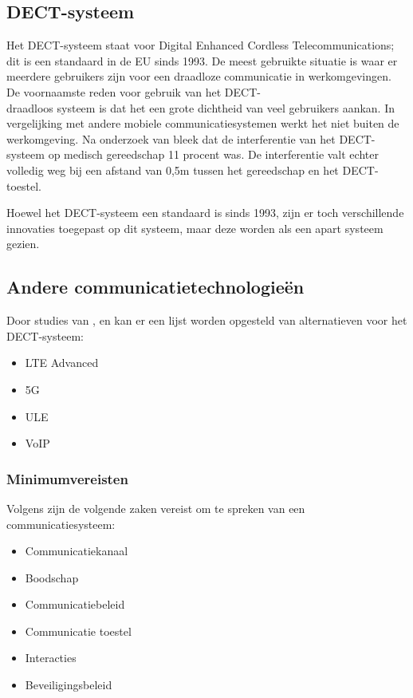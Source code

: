 \subsection{DECT-systeem}
Het DECT-systeem staat voor Digital Enhanced Cordless Telecommunications; dit is een standaard in de EU sinds 1993. De meest gebruikte situatie is waar er meerdere gebruikers zijn voor een draadloze communicatie in werkomgevingen. De voornaamste reden voor gebruik van het DECT-\\draadloos systeem is dat het een grote dichtheid van veel gebruikers aankan. In vergelijking met andere mobiele communicatiesystemen werkt het niet buiten de werkomgeving. \autocite{Welinder1997} Na onderzoek van \textcite{Welinder1997} bleek dat de interferentie van het DECT-systeem op medisch gereedschap 11 procent was. De interferentie valt echter volledig weg bij een afstand van 0,5m tussen het gereedschap en het DECT-toestel.


Hoewel het DECT-systeem een standaard is sinds 1993, zijn er toch verschillende innovaties toegepast op dit systeem, maar deze worden als een apart systeem gezien. 

\subsection{Andere communicatietechnologieën}

Door studies van \textcite{Montalvo2024}, \textcite{Kranz2010} en \textcite{Soenmez2018} kan er een lijst worden opgesteld van alternatieven voor het DECT-systeem:

\begin{itemize}
  \item LTE Advanced
  \item 5G
  \item ULE
  \item VoIP

\end{itemize}

\subsubsection{Minimumvereisten}

Volgens \textcite{Coiera2006} zijn de volgende zaken vereist om te spreken van een communicatiesysteem:
\begin{itemize}
  \item Communicatiekanaal
  \item Boodschap
  \item Communicatiebeleid
  \item Communicatie toestel
  \item Interacties
  \item Beveiligingsbeleid
\end{itemize}

